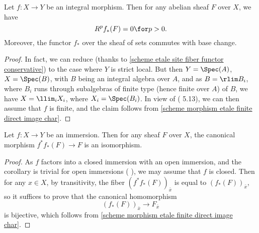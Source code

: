 \begin{corollary}\label{scheme morphism etale integral direct image vanish}
Let $f:X\to Y$ be an integral morphism. Then for any abelian sheaf $F$ over $X$, we have
\[R^pf_*(F)=0\for p>0.\]
Moreover, the functor $f_*$ over the sheaf of sets commutes with base change.
\end{corollary}
\begin{proof}
In fact, we can reduce (thanks to \cref{scheme etale site fiber functor conservative}) to the case where $Y$ is strict local. But then $Y=\Spec(A)$, $X=\Spec(B)$, with $B$ being an integral algebra over $A$, and as $B=\rlim B_i$, where $B_i$ runs through subalgebras of finite type (hence finite over $A$) of $B$, we have $X=\llim_iX_i$, where $X_i=\Spec(B_i)$. In view of (\cite{SGA4-2}  5.13), we can then assume that $f$ is finite, and the claim follows from \ref{scheme morphism etale finite direct image char}.
\end{proof}

\begin{corollary}\label{scheme immersion etale pushpull isomorphism}
Let $f:X\to Y$ be an immersion. Then for any sheaf $F$ over $X$, the canonical morphism $f^*f_*(F)\to F$ is an isomorphism.
\end{corollary}
\begin{proof}
As $f$ factors into a closed immersion with an open immersion, and the corollary is trivial for open immersions (\cite{SGA4-1} ), we may assume that $f$ is closed. Then for any $x\in X$, by transitivity, the fiber $(f^*f_*(F))_{\bar{x}}$ is equal to $(f_*(F))_{\bar{x}}$, so it suffices to prove that the canonical homomorphism
\[(f_*(F))_{\bar{x}}\to F_{\bar{x}}\]
is bijective, which follows from \cref{scheme morphism etale finite direct image char}.
\end{proof}

